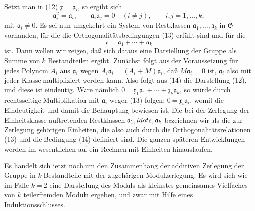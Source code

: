 \documentclass[11pt]{article}
\newcommand{\mG}{\mathfrak{G}}
\newcommand{\ma}{\mathfrak{a}}
\newcommand{\mx}{\mathfrak{x}}
\newcommand{\me}{\mathfrak{e}}
\begin{document}
Setzt man in (12) $\mx=\ma_i$, so ergibt sich
\begin{equation}
 \ma_i^2=\ma_i,
 \qquad \ma_i\ma_j=0\quad(i\ne j),
 \qquad i,j=1,\ldots,k,
\tag{13}
\end{equation}
mit $\ma_i\ne0$. Es sei nun umgekehrt ein System von Restklassen $\ma_1,\ldots,\ma_k$ in $\mG$ vorhanden, für die die Orthogonalitätsbedingungen (13) erfüllt sind und für die
\begin{equation}
 \me=\ma_1+\cdots+\ma_k
\tag{14}
\end{equation}
ist. Dann wollen wir zeigen, daß sich daraus eine Darstellung der Gruppe als Summe von $k$ Bestandteilen ergibt. Zunächst folgt aus der Voraussetzung für jedes Polynom $A_i$ aus $\ma_i$ wegen $A_i\ma_i=(A_i+M)\ma_i$, daß $M\ma_i=0$ ist, $\ma_i$ also mit jeder Klasse multipliziert werden kann. Also folgt aus (14) die Darstellung (12), und diese ist eindeutig. Wäre nämlich $0=\mx_1\ma_1+\cdots+\mx_k\ma_k$, so würde durch rechtsseitige Multiplikation mit $\ma_i$ wegen (13) folgen: $0=\mx_i\ma_i$, womit die Eindeutigkeit und damit die Behauptung bewiesen ist. Die bei der Zerlegung der Einheitsklasse auftretenden Restklassen $\ma_1,\\ldots,\ma_k$ bezeichnen wir als die zur Zerlegung gehörigen Einheiten, die also auch durch die Orthogonalitätsrelationen (13) und die Bedingung (14) definiert sind. Die ganzen späteren Entwicklungen werden im wesentlichen auf ein Rechnen mit Einheiten hinauslaufen.

Es handelt sich jetzt noch um den Zusammenhang der additiven Zerlegung der Gruppe in $k$ Bestandteile mit der zugehörigen Modulzerlegung. Es wird sich wie im Falle $k=2$ eine Darstellung des Moduls als kleinstes gemeinsames Vielfaches von $k$ teilerfremden Moduln ergeben, und zwar mit Hilfe eines Induktionsschlusses.
\end{document}
